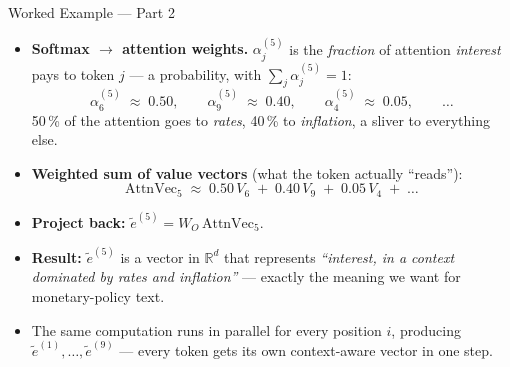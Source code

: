 \begin{frame}{Worked Example --- Part 2}
\begin{itemize}
\item \textbf{Softmax $\to$ attention weights.} $\alpha_{j}^{(5)}$ is the \emph{fraction} of attention \emph{interest} pays to token $j$ --- a probability, with $\sum_{j}\alpha_{j}^{(5)} = 1$:
\[
   \alpha_{6}^{(5)} \;\approx\; 0.50, \qquad
   \alpha_{9}^{(5)} \;\approx\; 0.40, \qquad
   \alpha_{4}^{(5)} \;\approx\; 0.05, \qquad
   \ldots
\]
50\,\% of the attention goes to \emph{rates}, 40\,\% to \emph{inflation}, a sliver to everything else.

\medskip
\item \textbf{Weighted sum of value vectors} (what the token actually ``reads''):
\[
   \text{AttnVec}_{5} \;\approx\; 0.50\,V_{6} \;+\; 0.40\,V_{9} \;+\; 0.05\,V_{4} \;+\; \ldots
\]

\medskip
\item \textbf{Project back:} $\tilde{e}^{(5)} = W_{O}\,\text{AttnVec}_{5}$.

\medskip
\item \textbf{Result:} $\tilde{e}^{(5)}$ is a vector in $\mathbb{R}^{d}$ that represents \emph{``interest, in a context dominated by rates and inflation''} --- exactly the meaning we want for monetary-policy text.

\medskip
\item The same computation runs in parallel for every position $i$, producing $\tilde{e}^{(1)}, \ldots, \tilde{e}^{(9)}$ --- every token gets its own context-aware vector in one step.
\end{itemize}
\end{frame}

